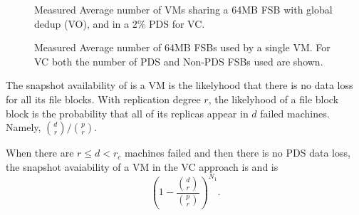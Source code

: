 \begin{figure}[ht]
  \centering
  \caption{Measured Average number of VMs sharing a 64MB FSB with global dedup (VO), and in a 2\% PDS for VC.}
  \label{fig-fsb-links}
\end{figure}

\begin{figure}[ht]
  \centering
  \caption{Measured Average number of 64MB FSBs used by a single VM. For VC both the number of PDS and Non-PDS FSBs used are shown.}
  \label{fig-vm-links}
\end{figure}

The snapshot availability of is a VM is the likelyhood that
there is no  data loss for all its file blocks.
With replication degree $r$, the likelyhood of
a file block block is the probability that  
all of its replicas appear in $d$ failed machines. 
Namely, $\binom{d}{r}/ \binom{p}{r}$.


When there are $r \le d<r_c$ machines failed and then there is no PDS data loss,  
the snapshot avaiability of a VM in the VC approach is 
and is
\[
(1-\frac{\binom{d}{r}} { \binom{p}{r} })^{N_1}.
\]

